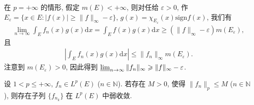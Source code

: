 \documentclass[../../main.tex]{subfiles}%
\begin{document}
\begin{remark}
在 $p=+\infty$ 的情形, 假定 $m(E)<+\infty$, 则对任给 $\varepsilon>0$, 作 $E_\varepsilon=\{x\in E:|f(x)|\geqslant\|f\|_\infty-\varepsilon\}$, $g(x)=\chi_{E_\varepsilon}(x)\mathrm{sign}f(x)$, 我们有
\begin{align*}
\lim_{n\to\infty}\int_E f_n(x)g(x)\mathrm{d}x=\int_E f(x)g(x)\mathrm{d}x\geqslant(\|f\|_\infty-\varepsilon)m(E_\varepsilon),
\end{align*}
且
\begin{align*}
\left|\int_E f_n(x)g(x)\mathrm{d}x\right|\leqslant\|f_n\|_\infty m(E_\varepsilon).
\end{align*}
注意到 $m(E_\varepsilon)>0$, 因此得到 $\varliminf_{n\to\infty}\|f_n\|_\infty\geqslant\|f\|_\infty-\varepsilon$.
\end{remark}

\begin{theorem}
设 $1<p\leqslant+\infty$, $f_n\in L^p(E)$ ($n\in\mathbb{N}$). 若存在 $M>0$, 使得 $\|f_n\|_p\leqslant M$ ($n\in\mathbb{N}$), 则存在子列 $\{f_{n_k}\}$ 在 $L^p(E)$ 中弱收敛.
\end{theorem}
\end{document}
